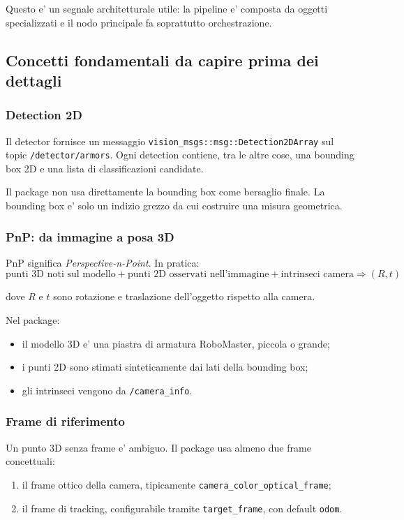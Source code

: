 \documentclass[11pt,a4paper]{article}
\newcommand{\code}[1]{\texttt{#1}}
\newcommand{\topic}[1]{\texttt{#1}}
\begin{document}
Questo e' un segnale architetturale utile: la pipeline e' composta da oggetti specializzati e il nodo principale fa soprattutto orchestrazione.

\subsection{Concetti fondamentali da capire prima dei dettagli}

\subsubsection{Detection 2D}

Il detector fornisce un messaggio \code{vision\_msgs::msg::Detection2DArray} sul topic \topic{/detector/armors}. Ogni detection contiene, tra le altre cose, una bounding box 2D e una lista di classificazioni candidate.

Il package non usa direttamente la bounding box come bersaglio finale. La bounding box e' solo un indizio grezzo da cui costruire una misura geometrica.

\subsubsection{PnP: da immagine a posa 3D}

PnP significa \emph{Perspective-n-Point}. In pratica:
\begin{equation}
  \text{punti 3D noti sul modello} + \text{punti 2D osservati nell'immagine} + \text{intrinseci camera}
  \Longrightarrow
  (R, t)
\end{equation}

dove \(R\) e \(t\) sono rotazione e traslazione dell'oggetto rispetto alla camera.

Nel package:
\begin{itemize}[leftmargin=1.4em]
  \item il modello 3D e' una piastra di armatura RoboMaster, piccola o grande;
  \item i punti 2D sono stimati sinteticamente dai lati della bounding box;
  \item gli intrinseci vengono da \topic{/camera_info}.
\end{itemize}

\subsubsection{Frame di riferimento}

Un punto 3D senza frame e' ambiguo. Il package usa almeno due frame concettuali:
\begin{enumerate}[leftmargin=1.4em]
  \item il frame ottico della camera, tipicamente \code{camera\_color\_optical\_frame};
  \item il frame di tracking, configurabile tramite \code{target\_frame}, con default \code{odom}.
\end{enumerate}
\end{document}
